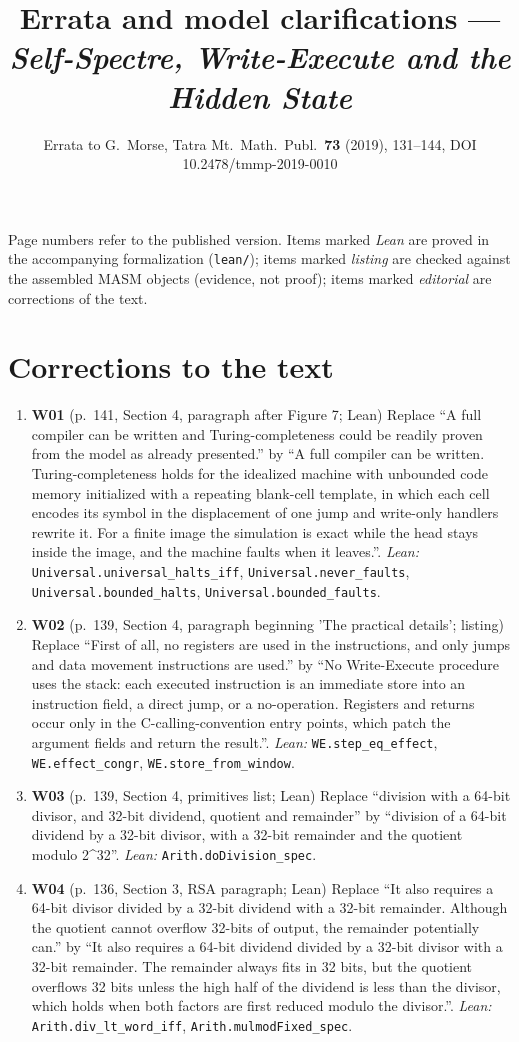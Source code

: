 \documentclass[10pt,twocolumn]{article}
\title{\vspace{-1cm}Errata and model clarifications --- \emph{Self-Spectre, Write-Execute and the Hidden State}}
\author{Errata to G.~Morse, Tatra Mt.\ Math.\ Publ.\ \textbf{73} (2019), 131--144, DOI 10.2478/tmmp-2019-0010}
\date{}
\begin{document}
\maketitle
\small
\noindent Page numbers refer to the published version. Items marked \emph{Lean} are proved in the accompanying
formalization (\texttt{lean/}); items marked \emph{listing} are checked against the assembled MASM objects
(evidence, not proof); items marked \emph{editorial} are corrections of the text.
\section*{Corrections to the text}
\begin{enumerate}[label=]
\item \textbf{W01} (p.~141, Section 4, paragraph after Figure 7; Lean) Replace ``A full compiler can be written and Turing-completeness could be readily proven from the model as already presented.'' by ``A full compiler can be written. Turing-completeness holds for the idealized machine with unbounded code memory initialized with a repeating blank-cell template, in which each cell encodes its symbol in the displacement of one jump and write-only handlers rewrite it. For a finite image the simulation is exact while the head stays inside the image, and the machine faults when it leaves.''. \emph{Lean:} \texttt{Universal.universal\_halts\_iff}, \texttt{Universal.never\_faults}, \texttt{Universal.bounded\_halts}, \texttt{Universal.bounded\_faults}.
\item \textbf{W02} (p.~139, Section 4, paragraph beginning 'The practical details'; listing) Replace ``First of all, no registers are used in the instructions, and only jumps and data movement instructions are used.'' by ``No Write-Execute procedure uses the stack: each executed instruction is an immediate store into an instruction field, a direct jump, or a no-operation. Registers and returns occur only in the C-calling-convention entry points, which patch the argument fields and return the result.''. \emph{Lean:} \texttt{WE.step\_eq\_effect}, \texttt{WE.effect\_congr}, \texttt{WE.store\_from\_window}.
\item \textbf{W03} (p.~139, Section 4, primitives list; Lean) Replace ``division with a 64-bit divisor, and 32-bit dividend, quotient and remainder'' by ``division of a 64-bit dividend by a 32-bit divisor, with a 32-bit remainder and the quotient modulo 2\^{}32''. \emph{Lean:} \texttt{Arith.doDivision\_spec}.
\item \textbf{W04} (p.~136, Section 3, RSA paragraph; Lean) Replace ``It also requires a 64-bit divisor divided by a 32-bit dividend with a 32-bit remainder. Although the quotient cannot overflow 32-bits of output, the remainder potentially can.'' by ``It also requires a 64-bit dividend divided by a 32-bit divisor with a 32-bit remainder. The remainder always fits in 32 bits, but the quotient overflows 32 bits unless the high half of the dividend is less than the divisor, which holds when both factors are first reduced modulo the divisor.''. \emph{Lean:} \texttt{Arith.div\_lt\_word\_iff}, \texttt{Arith.mulmodFixed\_spec}.

\end{enumerate}
\end{document}
